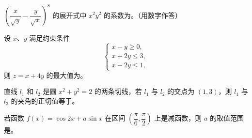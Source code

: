 \begin{question}
$\left(\dfrac{x}{\sqrt y}-\dfrac{y}{\sqrt x}\right)^8$ 的展开式中 $x^2y^2$ 的系数为\gkblank{}。（用数字作答）

\end{question}
\begin{question}
设 $x$、$y$ 满足约束条件
\nopagebreak[4]
\[\begin{cases}
x-y\geqslant 0,\\
x+2y\leqslant 3,\\
x-2y\leqslant 1,
\end{cases}\]
则 $z=x+4y$ 的最大值为\gkblank{}。

\end{question}
\begin{question}
直线 $l_1$ 和 $l_2$ 是圆 $x^2+y^2=2$ 的两条切线，若 $l_1$ 与 $l_2$ 的交点为 $(1,3)$，则 $l_1$ 与 $l_2$ 的夹角的正切值等于\gkblank{}。

\end{question}
\begin{question}
若函数 $f(x)=\cos2x+a\sin x$ 在区间 $\left(\dfrac\pi6,\dfrac\pi2\right)$ 上是减函数，则 $a$ 的取值范围是\gkblank{}。

\end{question}

